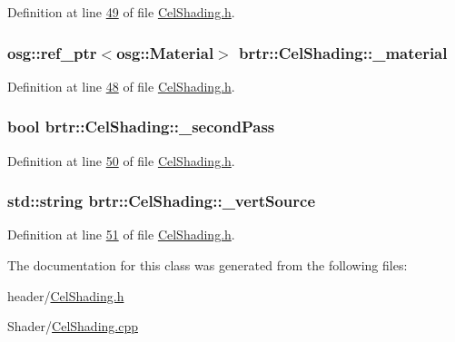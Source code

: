 Definition at line \hyperlink{_cel_shading_8h_source_l00049}{49} of file \hyperlink{_cel_shading_8h_source}{Cel\+Shading.\+h}.

\hypertarget{classbrtr_1_1_cel_shading_ae67a870d7a985694fb0d3290f0163f84}{
\subsubsection[{\+\_\+material}]{\setlength{\rightskip}{0pt plus 5cm}osg\+::ref\+\_\+ptr$<$osg\+::\+Material$>$ brtr\+::\+Cel\+Shading\+::\+\_\+material\hspace{0.3cm}{\ttfamily [private]}}}\label{classbrtr_1_1_cel_shading_ae67a870d7a985694fb0d3290f0163f84}


Definition at line \hyperlink{_cel_shading_8h_source_l00048}{48} of file \hyperlink{_cel_shading_8h_source}{Cel\+Shading.\+h}.

\hypertarget{classbrtr_1_1_cel_shading_a15226eda13f5a3deaee3260414f664bf}{
\subsubsection[{\+\_\+second\+Pass}]{\setlength{\rightskip}{0pt plus 5cm}bool brtr\+::\+Cel\+Shading\+::\+\_\+second\+Pass\hspace{0.3cm}{\ttfamily [private]}}}\label{classbrtr_1_1_cel_shading_a15226eda13f5a3deaee3260414f664bf}


Definition at line \hyperlink{_cel_shading_8h_source_l00050}{50} of file \hyperlink{_cel_shading_8h_source}{Cel\+Shading.\+h}.

\hypertarget{classbrtr_1_1_cel_shading_a6c9ea02f1a90b0ba711394c4ff716081}{
\subsubsection[{\+\_\+vert\+Source}]{\setlength{\rightskip}{0pt plus 5cm}std\+::string brtr\+::\+Cel\+Shading\+::\+\_\+vert\+Source\hspace{0.3cm}{\ttfamily [private]}}}\label{classbrtr_1_1_cel_shading_a6c9ea02f1a90b0ba711394c4ff716081}


Definition at line \hyperlink{_cel_shading_8h_source_l00051}{51} of file \hyperlink{_cel_shading_8h_source}{Cel\+Shading.\+h}.



The documentation for this class was generated from the following files\+:\begin{DoxyCompactItemize}
\item 
header/\hyperlink{_cel_shading_8h}{Cel\+Shading.\+h}\item 
Shader/\hyperlink{_cel_shading_8cpp}{Cel\+Shading.\+cpp}\end{DoxyCompactItemize}
